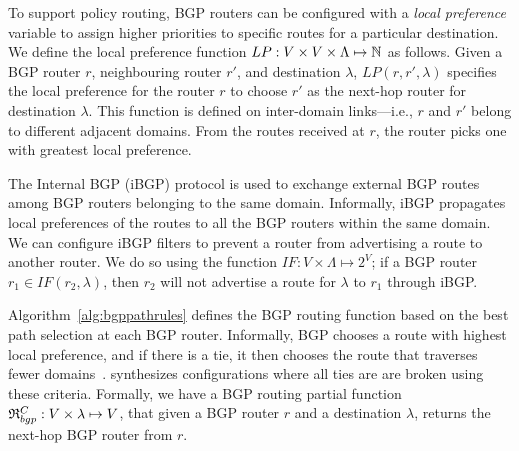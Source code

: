 To support policy routing, BGP routers can be configured with a
\emph{local preference} variable to assign higher priorities to
specific routes for a particular destination. We define the local
preference function $LP: V \times V \times \Lambda \mapsto \mathbb{N}$ as
follows.  Given a BGP router $r$, neighbouring router $r'$, and  
destination $\lambda$, $LP(r, r', \lambda)$ specifies the local
preference for the router $r$ to choose $r'$ as the next-hop router for destination $\lambda$.  This function is defined
on inter-domain links---i.e., $r$ and $r'$ belong to different adjacent domains.  
From the routes received at $r$, the router
picks one with greatest local preference.

The Internal BGP (iBGP) protocol is used to 
exchange external BGP routes 
among BGP routers belonging
to the same domain. Informally, iBGP propagates local preferences of the routes to all the BGP routers within the same domain. 
We can configure iBGP 
filters to prevent a router from advertising 
a route to another router. We do so using the 
function $IF: V \times \Lambda \mapsto 2^V$;
if a BGP router $r_1 \in IF(r_2, \lambda)$, then
$r_2$ will not advertise a route for $\lambda$ to
$r_1$ through iBGP. 
 
Algorithm~\ref{alg:bgppathrules} defines the BGP routing function
based on the best path selection at each BGP router. 
Informally, BGP 
chooses a route with highest local preference, and
if there is a tie, it then chooses the route that traverses fewer domains~\cite{bgp}. 
\name synthesizes configurations where all ties are 
are broken using these criteria. Formally, we have a BGP routing
partial function 
$\mathfrak{R}_{bgp}^C: V \times \lambda \mapsto V$, 
that given a BGP router $r$ and a destination $\lambda$,
returns the next-hop BGP router from $r$. 

